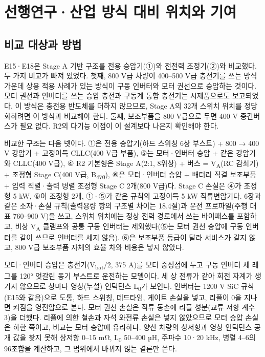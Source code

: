 \chapter{선행연구·산업 방식 대비 위치와 기여}

\section{비교 대상과 방법}

E15·E18은 Stage A 기반 구조를 전용 승압기(①)와 전전력 조정기(②)와 비교했다. 두 가지 비교가 빠져 있었다. 첫째, 800 V급 차량이 400–500 V급 충전기를 쓰는 방식 가운데 상용 적용 사례가 있는 방식이 구동 인버터와 모터 권선으로 승압하는 것이다\cite{b24,b25}. 모터 권선과 인버터를 쓰는 승압 충전과 구동계 통합 충전기는 시제품으로도 보고되었다\cite{b27,b28}. 이 방식은 충전용 반도체를 더하지 않으므로, Stage A의 32개 스위치 위치를 정당화하려면 이 방식과 비교해야 한다. 둘째, 보조부품을 800 V급으로 두면 400 V 중간버스가 필요 없다. R2의 다기능 이점이 이 설계보다 나은지 확인해야 한다. 

비교한 구조는 다음 넷이다. ①은 전용 승압기(하드 스위칭 6상 부스트)\cite{b29,b26} + 800 → 400 V 강압기 + 고정이득 CLLC(400 V급 부품), ⑤는 모터·인버터 승압 + 같은 강압기와 CLLC(400 V급), ④ R2 기본형은 Stage A(2:1, 8위상) + 버스 = V\textsubscript{A}(RC 감쇠기) + 조정형 Stage C(400 V급, B\textsubscript{470}), ⑥은 모터·인버터 승압 + 배터리 직결 보조부품 + 입력 직렬·출력 병렬 조정형 Stage C 2개(800 V급)다. Stage C 손실은 ④가 조정형 5 kW, ⑥이 조정형 2개, ①·⑤가 같은 규칙의 고정이득 5 kW 직류변압기다. 6장과 같은 소자·손실 규칙(출력용량 항의 구조별 차이는 18.4절)과 운전 프로파일(주행 대표 760–900 V)을 쓰고, 스위치 위치에는 정상 전력 경로에서 쓰는 바이패스를 포함하고, 비상 V\textsubscript{A} 클램프와 공통 구동 인버터는 제외했다(⑤는 모터 권선 승압에 구동 인버터를 같이 쓰므로 인버터를 세지 않음). ⑥은 보조부품 등급이 달라 서비스가 같지 않고, 800 V급 보조부품 자체의 효율 차와 비용은 넣지 않았다.

모터·인버터 승압은 충전기(V\textsubscript{bat}/2, 375 A)를 모터 중성점에 두고 구동 인버터 세 레그를 120° 엇갈린 동기 부스트로 운전하는 모델이다. 세 상 전류가 같아 회전 자계가 생기지 않으므로 상마다 영상(누설) 인덕턴스 L\textsubscript{0}가 보인다. 인버터는 1200 V SiC 규칙(E15와 같음)으로 도통, 하드 스위칭, 데드타임, 게이트 손실을 넣고, 리플이 0을 지나면 켜짐을 영전압으로 본다. 모터 권선 손실은 직류 동손에 리플 성분(교류 저항 계수 3)을 더했다. 리플에 의한 철손과 자석 와전류 손실은 넣지 않았으므로 모터 승압 손실은 하한 쪽이고, 비교는 모터 승압에 유리하다. 양산 차량의 상저항과 영상 인덕턴스 공개 값을 찾지 못해 상저항 0–15 mΩ, L\textsubscript{0} 50–400 µH, 주파수 10·20 kHz, 병렬 4–6의 96조합을 계산하고, 그 범위에서 바뀌지 않는 결론만 쓴다.

